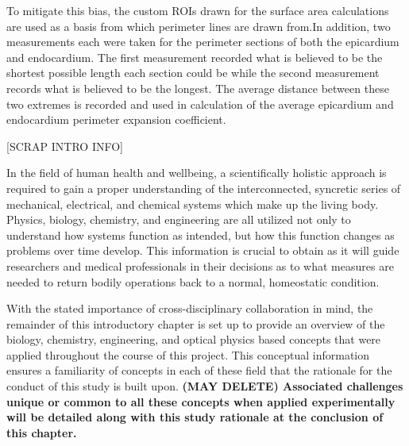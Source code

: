 To mitigate this bias, the custom ROIs drawn for the surface area calculations are used as a basis from which perimeter lines are drawn from.In addition, two measurements each were taken for the perimeter sections of both the epicardium and endocardium. The first measurement recorded what is believed to be the shortest possible length each section could be while the second measurement records what is believed to be the longest. The average distance between these two extremes is recorded and used in calculation of the average epicardium and endocardium perimeter expansion coefficient. 

[SCRAP INTRO INFO]

In the field of human health and wellbeing, a scientifically holistic approach is required to gain a proper understanding of the interconnected, syncretic series of mechanical, electrical, and chemical systems which make up the living body. Physics, biology, chemistry, and engineering are all utilized not only to understand how systems function as intended, but how this function changes as problems over time develop. This information is crucial to obtain as it will guide researchers and medical professionals in their decisions as to what measures are needed to return bodily operations back to a normal, homeostatic condition. 

With the stated importance of cross-disciplinary collaboration in mind, the remainder of this introductory chapter is set up to provide an overview of the biology, chemistry, engineering, and optical physics based concepts that were applied throughout the course of this project. This conceptual information ensures a familiarity of concepts in each of these field that the rationale for the conduct of this study is built upon. \textbf{ (MAY DELETE) Associated challenges unique or common to all these concepts when applied experimentally will be detailed along with this study rationale at the conclusion of this chapter.}
